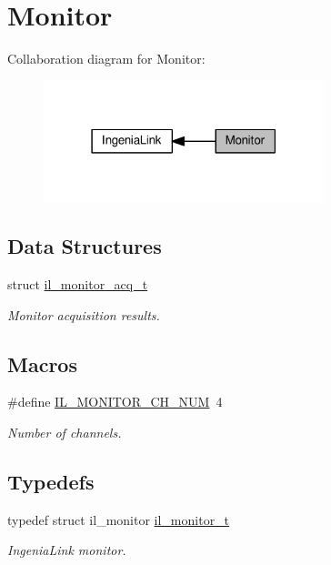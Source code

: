 \hypertarget{group__IL__MONITOR}{}\section{Monitor}
\label{group__IL__MONITOR}
Collaboration diagram for Monitor\+:\nopagebreak
\begin{figure}[H]
\begin{center}
\leavevmode
\includegraphics[width=231pt]{group__IL__MONITOR}
\end{center}
\end{figure}
\subsection*{Data Structures}
\begin{DoxyCompactItemize}
\item 
struct \hyperlink{structil__monitor__acq__t}{il\+\_\+monitor\+\_\+acq\+\_\+t}
\begin{DoxyCompactList}\small\item\em Monitor acquisition results. \end{DoxyCompactList}\end{DoxyCompactItemize}
\subsection*{Macros}
\begin{DoxyCompactItemize}
\item 
\#define \hyperlink{group__IL__MONITOR_ga05007f227fb5f253ed8ba714c0efb2cd}{I\+L\+\_\+\+M\+O\+N\+I\+T\+O\+R\+\_\+\+C\+H\+\_\+\+N\+UM}~4
\begin{DoxyCompactList}\small\item\em Number of channels. \end{DoxyCompactList}\end{DoxyCompactItemize}
\subsection*{Typedefs}
\begin{DoxyCompactItemize}
\item 
typedef struct il\+\_\+monitor \hyperlink{group__IL__MONITOR_ga40e12e851c8c83202f0bccbaaafbc1f3}{il\+\_\+monitor\+\_\+t}
\begin{DoxyCompactList}\small\item\em Ingenia\+Link monitor. \end{DoxyCompactList}\end{DoxyCompactItemize}
